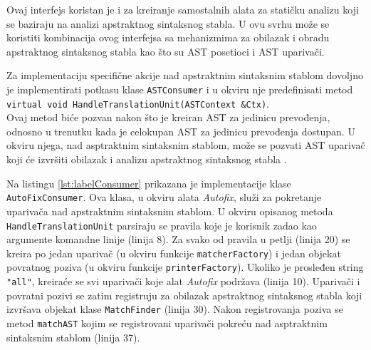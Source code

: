 \documentclass[12pt,oneside]{memoir}
\begin{document}
Ovaj interfejs koristan je i za kreiranje samostalnih alata za stati\v{c}ku analizu koji se baziraju na analizi apstraktnog sintaksnog stabla. U ovu svrhu mo\v{z}e se koristiti kombinacija
ovog interfejsa sa mehanizmima za obilazak i obradu apstraktnog sintaksnog stabla kao \v{s}to su AST posetioci i AST upariva\v{c}i. \par
Za implementaciju specifi\v{c}ne akcije nad apstraktnim sintaksnim stablom
dovoljno je implementirati potkasu klase \texttt{ASTConsumer} i u okviru nje predefinisati metod \\ \texttt{virtual void  HandleTranslationUnit(ASTContext \&Ctx)}.\\
Ovaj metod bi\'{c}e pozvan nakon \v{s}to je kreiran AST za jedinicu prevođenja, odnosno u trenutku kada je celokupan AST za jedinicu prevođenja dostupan.
U okviru njega, nad asptraktnim sintaksnim stablom, mo\v{z}e se pozvati AST upariva\v{c} koji \'{c}e izvr\v{s}iti obilazak i analizu apstraktnog sintaksnog stabla \cite{ASTConsumer}.

\par
Na listingu \ref{lst:labelConsumer} prikazana je implementacije klase \texttt{AutoFixConsumer}. Ova klasa, u okviru alata \textit{Autofix}, slu\v{z}i za pokretanje 
upariva\v{c}a nad apstraktnim sintaksnim stablom. U okviru opisanog metoda \texttt{HandleTranslationUnit} parsiraju se pravila koje je korisnik zadao kao argumente komandne linije (linija 8). Za svako
od pravila u petlji (linija 20) se kreira po jedan upariva\v{c} (u okviru funkcije \texttt{matcherFactory}) i jedan objekat povratnog poziva (u okviru funkcije \texttt{printerFactory}).
Ukoliko je prosleđen string \texttt{"all"}, kreira\'{c}e se svi upariva\v{c}i koje alat \textit{Autofix} podr\v{z}ava (linija 10).
Upariva\v{c}i i povratni pozivi se zatim registruju za obilazak apstraktnog sintaksnog stabla koji izvr\v{s}ava objekat klase \texttt{MatchFinder} (linija 30). Nakon registrovanja poziva se metod \texttt{matchAST} kojim se registrovani upariva\v{c}i pokre\'{c}u nad asptraktnim sintaksnim stablom (linija 37).
\end{document}
